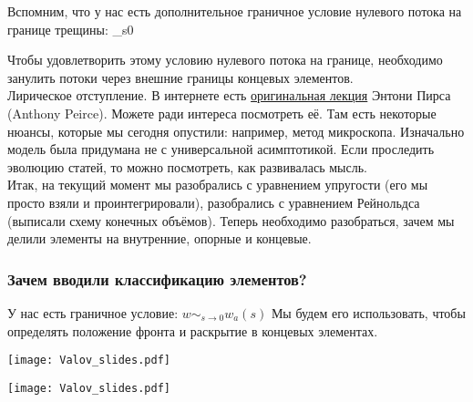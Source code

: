 \documentclass[main.tex]{subfiles}
\begin{document}
Вспомним, что у нас есть дополнительное граничное условие нулевого потока на границе трещины:
\beq
{}\cdot{}\mathop{=}_{s}0
\eeq

Чтобы удовлетворить этому условию нулевого потока на границе, необходимо занулить потоки через внешние границы концевых элементов.
\\

Лирическое отступление.
В интернете есть \href{https://www.youtube.com/watch?v=PXfy5f9kWh4}{оригинальная лекция} Энтони Пирса (Anthony Peirce).
Можете ради интереса посмотреть её.
Там есть некоторые нюансы, которые мы сегодня опустили: например, метод микроскопа.
Изначально модель была придумана не с универсальной асимптотикой.
Если проследить эволюцию статей, то можно посмотреть, как развивалась мысль.
\\

Итак, на текущий момент мы разобрались с уравнением упругости (его мы просто взяли и проинтегрировали), разобрались с уравнением Рейнольдса (выписали схему конечных объёмов).
Теперь необходимо разобраться, зачем мы делили элементы на внутренние, опорные и концевые.


\subsubsection{Зачем вводили классификацию элементов?}

У нас есть граничное условие: $\displaystyle{}w\mathop{\sim}_{s\to 0}w_a(s)$
Мы будем его использовать, чтобы определять положение фронта и раскрытие в концевых элементах.

\begin{center}
\texttt{[image: Valov\_slides.pdf]}
\end{center}

\begin{center}
\texttt{[image: Valov\_slides.pdf]}
\end{center}
\end{document}

